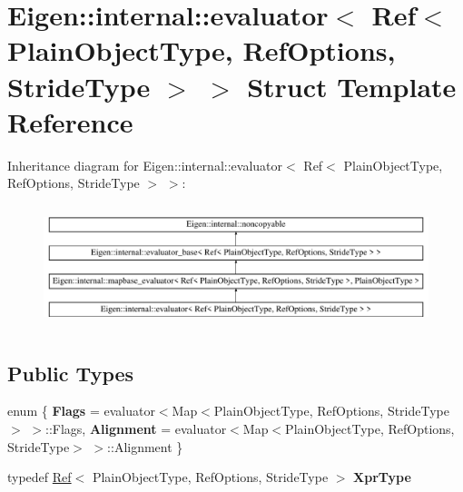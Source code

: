 \hypertarget{struct_eigen_1_1internal_1_1evaluator_3_01_ref_3_01_plain_object_type_00_01_ref_options_00_01_stride_type_01_4_01_4}{}\section{Eigen\+::internal\+::evaluator$<$ Ref$<$ Plain\+Object\+Type, Ref\+Options, Stride\+Type $>$ $>$ Struct Template Reference}
\label{struct_eigen_1_1internal_1_1evaluator_3_01_ref_3_01_plain_object_type_00_01_ref_options_00_01_stride_type_01_4_01_4}
Inheritance diagram for Eigen\+::internal\+::evaluator$<$ Ref$<$ Plain\+Object\+Type, Ref\+Options, Stride\+Type $>$ $>$\+:\begin{figure}[H]
\begin{center}
\leavevmode
\includegraphics[height=3.618740cm]{struct_eigen_1_1internal_1_1evaluator_3_01_ref_3_01_plain_object_type_00_01_ref_options_00_01_stride_type_01_4_01_4}
\end{center}
\end{figure}
\subsection*{Public Types}
\begin{DoxyCompactItemize}
\item 
\mbox{\label{struct_eigen_1_1internal_1_1evaluator_3_01_ref_3_01_plain_object_type_00_01_ref_options_00_01_stride_type_01_4_01_4_a7278b3c0f47521e08535bdc3f6b8000c}} 
enum \{ {\bfseries Flags} = evaluator$<$Map$<$Plain\+Object\+Type, Ref\+Options, Stride\+Type$>$ $>$\+::Flags, 
{\bfseries Alignment} = evaluator$<$Map$<$Plain\+Object\+Type, Ref\+Options, Stride\+Type$>$ $>$\+::Alignment
 \}
\item 
\mbox{\label{struct_eigen_1_1internal_1_1evaluator_3_01_ref_3_01_plain_object_type_00_01_ref_options_00_01_stride_type_01_4_01_4_a49f98301ac153b880b54008edd822e9e}} 
typedef \mbox{\hyperlink{class_eigen_1_1_ref}{Ref}}$<$ Plain\+Object\+Type, Ref\+Options, Stride\+Type $>$ {\bfseries Xpr\+Type}
\end{DoxyCompactItemize}
